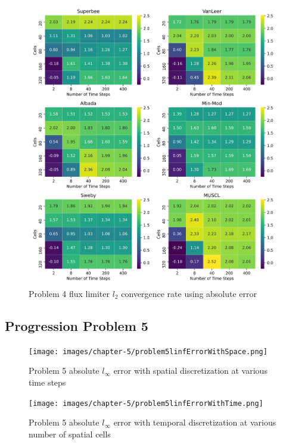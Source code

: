 \clearpage

\begin{figure}[p]
    \centering
    \includegraphics[width=6in]{images/chapter-5/problem4l2FluxLimiterConvergenceRate.png}
    \caption{Problem 4 flux limiter $l_{2}$ convergence rate using absolute error}
    \label{fig:problem4_l2error_fluxlimiter_convergence_rate}
\end{figure}

\clearpage

\subsection{Progression Problem 5}
\begin{figure}[p]
    \centering
    \texttt{[image: images/chapter-5/problem5linfErrorWithSpace.png]}
    \caption{Problem 5 absolute $l_{\infty}$ error with spatial discretization at various time steps }
    \label{fig:problem5_linferror_spatial_results}
\end{figure}

\clearpage

\begin{figure}[p]
    \centering
    \texttt{[image: images/chapter-5/problem5linfErrorWithTime.png]}
    \caption{Problem 5 absolute $l_{\infty}$ error with temporal discretization at various number of spatial cells}
    \label{fig:problem5_linferror_time_results}
\end{figure}


